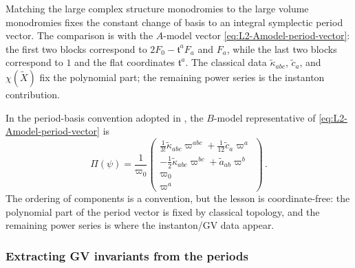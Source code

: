 Matching the large complex structure monodromies to the large volume
monodromies fixes the constant change of basis to an integral
symplectic period vector.  The comparison is with the $A$-model vector
\eqref{eq:L2-Amodel-period-vector}: the first two blocks correspond
to $2F_0-\mathfrak t^aF_a$ and $F_a$, while the last two blocks
correspond to $1$ and the flat coordinates $\mathfrak t^a$.  The
classical data $\widetilde\kappa_{abc}$, $\widetilde c_a$, and
$\chi(\widetilde X)$ fix the polynomial part;
the remaining power series is the instanton contribution.

In the period-basis convention adopted in \cite{Demirtas:2023als},
the $B$-model representative of \eqref{eq:L2-Amodel-period-vector} is
\begin{equation}\label{eq:L2-CMS-period-vector}
    \Pi(\psi)
      =
      \frac{1}{\varpi_0}
      \begin{pmatrix}
      \frac{1}{3!}\widetilde\kappa_{abc}\varpi^{abc}
        +\frac{1}{12}\widetilde c_a\varpi^a\\
      -\frac{1}{2}\widetilde\kappa_{abc}\varpi^{bc}
        +\widetilde a_{ab}\varpi^b\\
      \varpi_0\\
      \varpi^a
      \end{pmatrix}\, .
\end{equation}
The ordering of components is a convention, but the lesson is
coordinate-free: the polynomial part of the period vector is fixed
by classical topology, and the remaining power series is where the
instanton/GV data appear.

\subsubsection*{Extracting GV invariants from the periods}

